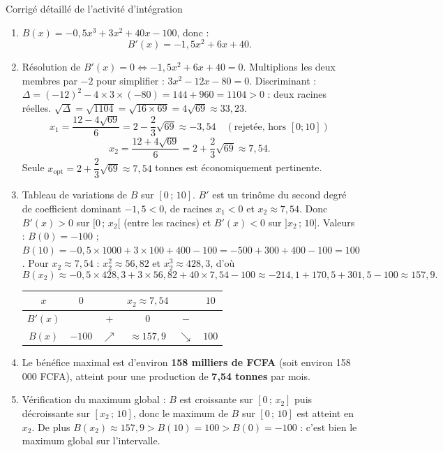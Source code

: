 \documentclass[11pt]{article}
\begin{document}
\begin{exoresolu}{Corrigé détaillé de l'activité d'intégration}
\begin{enumerate}
    \item $B(x) = -0,5x^{3} + 3x^{2} + 40x - 100$, donc :
    \[
    B'(x) = -1,5x^{2} + 6x + 40.
    \]
    \item Résolution de $B'(x) = 0 \iff -1,5x^{2} + 6x + 40 = 0$.
    Multiplions les deux membres par $-2$ pour simplifier : $3x^{2} - 12x - 80 = 0$.
    Discriminant : $\Delta = (-12)^{2} - 4 \times 3 \times (-80) = 144 + 960 = 1104 > 0$ : deux racines réelles.
    $\sqrt{\Delta} = \sqrt{1104} = \sqrt{16 \times 69} = 4\sqrt{69} \approx 33,23$.
    \[
    x_1 = \frac{12 - 4\sqrt{69}}{6} = 2 - \frac{2}{3}\sqrt{69} \approx -3,54 \quad (\text{rejetée, hors } [0;10])
    \]
    \[
    x_2 = \frac{12 + 4\sqrt{69}}{6} = 2 + \frac{2}{3}\sqrt{69} \approx 7,54.
    \]
    Seule $x_{\text{opt}} = 2 + \dfrac{2}{3}\sqrt{69} \approx 7,54$ tonnes est économiquement pertinente.
    \item Tableau de variations de $B$ sur $[0\,;\, 10]$.
    $B'$ est un trinôme du second degré de coefficient dominant $-1,5 < 0$, de racines $x_1 < 0$ et $x_2 \approx 7,54$. Donc $B'(x) > 0$ sur $[0\,;\, x_2[$ (entre les racines) et $B'(x) < 0$ sur $]x_2\,;\, 10]$.
    Valeurs : $B(0) = -100$ ; $B(10) = -0,5 \times 1000 + 3 \times 100 + 400 - 100 = -500 + 300 + 400 - 100 = 100$.
    Pour $x_2 \approx 7,54$ : $x_2^{2} \approx 56,82$ et $x_2^{3} \approx 428,3$, d'où
    \[
    B(x_2) \approx -0,5 \times 428,3 + 3 \times 56,82 + 40 \times 7,54 - 100 \approx -214,1 + 170,5 + 301,5 - 100 \approx 157,9.
    \]
    \begin{center}
    \begin{tabular}{|c|ccccc|}\hline
    $x$ & $0$ & & $x_2 \approx 7,54$ & & $10$ \\ \hline
    $B'(x)$ & & $+$ & $0$ & $-$ & \\ \hline
    $B(x)$ & $-100$ & $\nearrow$ & $\approx 157,9$ & $\searrow$ & $100$ \\ \hline
    \end{tabular}
    \end{center}
    \item Le bénéfice maximal est d'environ \textbf{158 milliers de FCFA} (soit environ 158\,000 FCFA), atteint pour une production de \textbf{7,54 tonnes} par mois.
    \item Vérification du maximum global : $B$ est croissante sur $[0\,;\, x_2]$ puis décroissante sur $[x_2\,;\, 10]$, donc le maximum de $B$ sur $[0\,;\, 10]$ est atteint en $x_2$. De plus $B(x_2) \approx 157,9 > B(10) = 100 > B(0) = -100$ : c'est bien le maximum global sur l'intervalle.
\end{enumerate}


\end{exoresolu}
\end{document}
